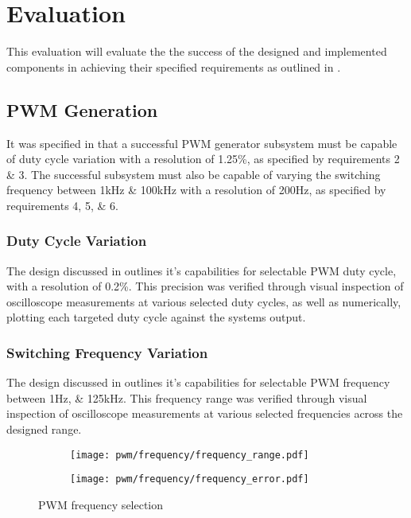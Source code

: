 \chapter{Evaluation}\label{C:evaluation}

This evaluation will evaluate the the success of the designed and implemented components in achieving their specified requirements as outlined in .


\section{PWM Generation}\label{S:pwm_gen_eval}

It was specified in  that a successful PWM generator subsystem must be capable of duty cycle variation with a resolution of 1.25\%, as specified by requirements 2 \& 3. The successful subsystem must also be capable of varying the switching frequency between 1kHz \& 100kHz with a resolution of 200Hz, as specified by requirements 4, 5, \& 6. 

\subsection*{Duty Cycle Variation}

The design discussed in  outlines it's capabilities for selectable PWM duty cycle, with a resolution of 0.2\%. This precision was verified through visual inspection of oscilloscope measurements at various selected duty cycles, as well as numerically, plotting each targeted duty cycle against the systems output.\\

\subsection*{Switching Frequency Variation}

The design discussed in  outlines it's capabilities for selectable PWM frequency between 1Hz, \& 125kHz. This frequency range was verified through visual inspection of oscilloscope measurements at various selected frequencies across the designed range. 

\begin{figure}[H]
    
    \centering
    \begin{subfigure}{0.45\textwidth}
        \texttt{[image: pwm/frequency/frequency\_range.pdf]}
    \end{subfigure}
    \begin{subfigure}{0.45\textwidth}
        \texttt{[image: pwm/frequency/frequency\_error.pdf]}
    \end{subfigure}
    \caption{PWM frequency selection}
    \vspace{-10pt}
    \label{F:pwm_frequency_eval}
\end{figure}

